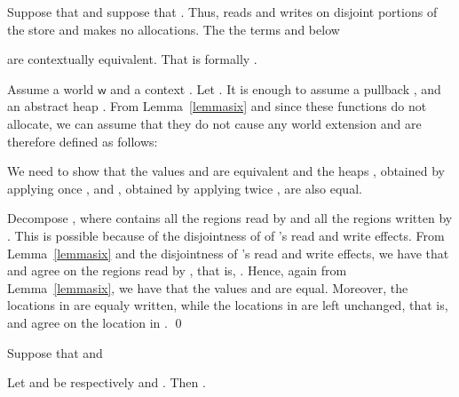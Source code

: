 \documentclass[orivec]{llncs}
\renewenvironment{proof}{\vspace{-1mm} \noindent {\bf Proof}\quad}{\qed}
\newcommand\w{\ensuremath{\mathsf{w}}\xspace}
\begin{document}
\begin{proposition}\label{dupl}
  Suppose that  and suppose
that
  . Thus, 
  reads and writes on disjoint portions of the store and makes no
  allocations. The the terms   and  below

 are contextually equivalent. That is
formally .
\end{proposition}

\begin{proof}
Assume a world \w and a context .
Let . 
It is enough to assume a pullback 
, and an abstract heap . 
From Lemma~\ref{lemmasix} and since these functions do not allocate, we
can assume that they do not cause any world extension and are therefore
defined as follows:

We need to show that the values  and  are equivalent and 
the heaps , obtained by applying once , and ,
obtained by applying twice , are also equal. 

Decompose , where  contains all
the regions read by  and  all the regions written by . This is
possible because of the disjointness of of 's read and write effects. 
From Lemma~\ref{lemmasix} and the disjointness of  's read and write
effects, we have that  and  agree on the regions read
by , that is, . Hence, again
from Lemma~\ref{lemmasix}, we have that the values  and 
are equal. Moreover, the locations in  are equaly written, while the
locations in  are left unchanged, that is,
 and  agree on the location in .
\end{proof}

\begin{proposition}\label{hoist}
Suppose that  and 

Let  and  be respectively  and
. 
Then .
\end{proposition}
\end{document}
